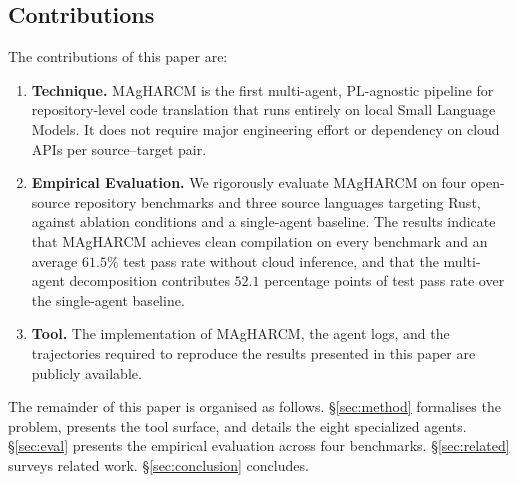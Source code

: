 \subsection{Contributions}

The contributions of this paper are:
\begin{enumerate}
    \item \textbf{Technique.} MAgHARCM is the first multi-agent,
    PL-agnostic pipeline for repository-level code translation that runs
    entirely on local Small Language Models. It does not require major
    engineering effort or dependency on cloud APIs per source--target
    pair.
    \item \textbf{Empirical Evaluation.} We rigorously evaluate MAgHARCM
    on four open-source repository benchmarks and three source languages
    targeting Rust, against ablation conditions and a single-agent
    baseline. The results indicate that MAgHARCM achieves clean
    compilation on every benchmark and an average $61.5\%$ test pass
    rate without cloud inference, and that the multi-agent decomposition
    contributes $52.1$ percentage points of test pass rate over the
    single-agent baseline.
    \item \textbf{Tool.} The implementation of MAgHARCM, the agent logs,
    and the trajectories required to reproduce the results presented in
    this paper are publicly available.
\end{enumerate}

The remainder of this paper is organised as follows.
§\ref{sec:method} formalises the problem, presents the tool surface,
and details the eight specialized agents. §\ref{sec:eval} presents the empirical
evaluation across four benchmarks. §\ref{sec:related} surveys related
work. §\ref{sec:conclusion} concludes.
